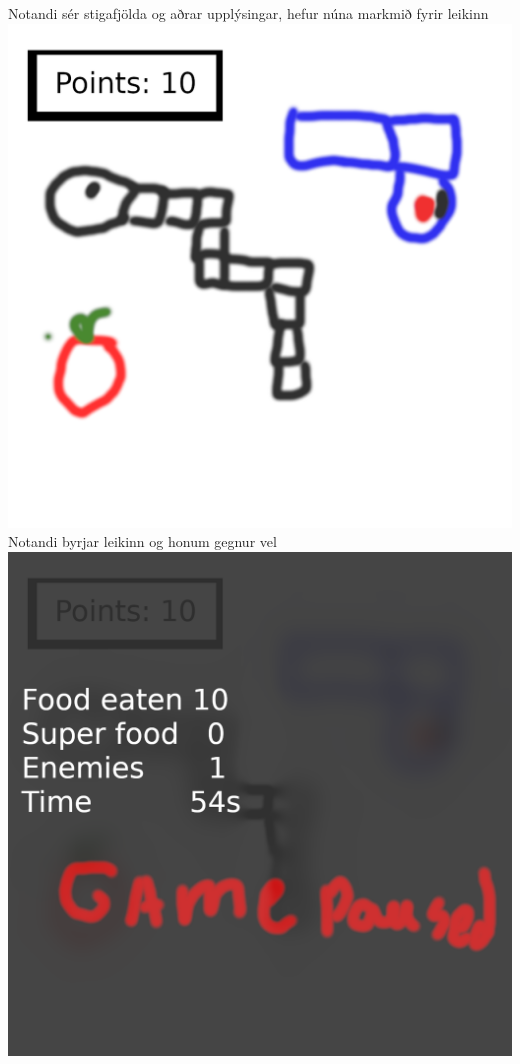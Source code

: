 \documentclass{article}
\begin{document}
\begin{center}
    Notandi sér stigafjölda og aðrar upplýsingar, hefur núna markmið fyrir leikinn\\
    \includegraphics[scale=0.75]{m3.png}\\
    Notandi byrjar leikinn og honum gegnur vel\\
    \includegraphics[scale=0.75]{m4.png}\\

\end{center}
\end{document}
